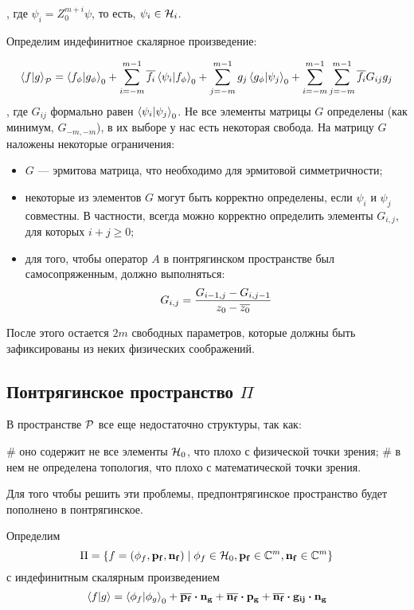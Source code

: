 , где $\psi_i = Z_0^{m + i} \psi$, то есть, $\psi_i \in \mathcal{H}_{i}$.

Определим индефинитное скалярное произведение:

\[
\ip{f}{g}_\mcP =
\ip{f_\phi}{g_\phi}_0 +
\sum\limits_{i = -m}^{m - 1} \cconj{f_i} \ip{\psi_i}{f_\phi}_0 +
\sum\limits_{j = -m}^{m - 1} g_j \ip{g_\phi}{\psi_j}_0 +
\sum\limits_{i = -m}^{m - 1} \sum\limits_{j = -m}^{m - 1} \cconj{f_i} G_{ij} g_j
\]
, где $G_{ij}$ формально равен $\ip{\psi_i}{\psi_j}_0$. Не все элементы матрицы $G$ определены (как минимум, $G_{-m, -m}$), в их выборе у нас есть некоторая свобода. На матрицу $G$ наложены некоторые ограничения:

\begin{itemize}
\item $G$ — эрмитова матрица, что необходимо для эрмитовой симметричности;
\item некоторые из элементов $G$ могут быть корректно определены, если $\psi_i$ и $\psi_j$ совместны. В частности, всегда можно корректно определить элементы $G_{i, j}$, для которых $i + j \ge 0$;
\item для того, чтобы оператор $A$ в понтрягинском пространстве был самосопряженным, должно выполняться:
\[
G_{i, j} = \frac{G_{i - 1, j} - G_{i, j - 1}}{z_0 - \overline{z_0}}
\]
\end{itemize}

После этого остается $2 m$ свободных параметров, которые должны быть зафиксированы из неких физических соображений.

\subsection{Понтрягинское пространство $\Pi$}
В пространстве $\mathcal{P}$ все еще недостаточно структуры, так как:
\begin{ilist}
# оно содержит не все элементы $\mathcal{H}_{0}$, что плохо с физической точки зрения;
# в нем не определена топология, что плохо с математической точки зрения.
\end{ilist}

Для того чтобы решить эти проблемы, предпонтрягинское пространство будет пополнено в понтрягинское.

Определим 
\[
\Pi = \{f = (\phi_f, \vb{p_f}, \vb{n_f}) \mid \phi_f \in \mathcal{H}_{0}, \vb{p_f} \in \mathbb{C}^m, \vb{n_f} \in \mathbb{C}^m \}
\]
с индефинитным скалярным произведением
\[
\ip{f}{g} =
\ip{\phi_f}{\phi_g}_0 +
\cconj{\vb{p_f}} \vdot \vb{n_g} +
\cconj{\vb{n_f}} \vdot \vb{p_g} + 
\cconj{\vb{n_f}} \vdot \vb{g_{ij}} \vdot \vb{n_g}
\]

